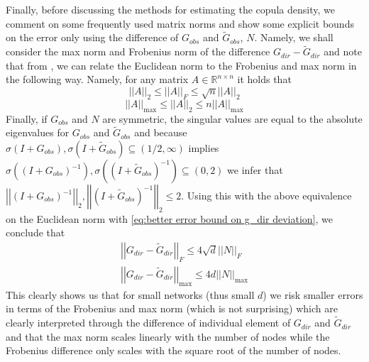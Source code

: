 \documentclass[../Thesis.tex]{subfiles}
\begin{document}
Finally, before discussing the methods for estimating the copula density, we comment on some frequently used matrix norms and show some explicit bounds on the error only using the difference of $G_{obs}$ and $\tilde{G}_{obs}$, $N$. Namely, we shall consider the max norm and Frobenius norm of the difference $G_{dir} - \tilde{G}_{dir}$ and note that from \cite{GoluVanl96}, we can relate the Euclidean norm to the Frobenius and max norm in the following way. Namely, for any matrix $A\in \mathbb{R}^{n\times n}$ it holds that
$$\left|\left| A \right|\right|_2 \leq \left|\left| A \right|\right|_F \leq \sqrt{n} \left|\left| A \right|\right|_2$$
$$\left|\left| A \right|\right|_{\max} \leq \left|\left| A \right|\right|_2 \leq n \left|\left| A \right|\right|_{\max} $$
Finally, if $G_{obs}$ and $N$ are symmetric, the singular values are equal to the absolute eigenvalues for $G_{obs}$ and $\tilde{G}_{obs}$ and because $\sigma\left(I + G_{obs}\right), \sigma\left(I + \tilde{G}_{obs}\right) \subseteq (1/2, \infty)$ implies $\sigma\left(\left(I + G_{obs}\right)^{-1}\right), \sigma\left(\left( I +\tilde{ G}_{obs}\right)^{-1}\right) \subseteq (0,2)$ we infer that $\left|\left| \left(I + G_{obs}\right)^{-1} \right|\right|_2 , \left|\left| \left(I + \tilde{G}_{obs}\right)^{-1} \right|\right|_2\leq 2$. Using this with the above equivalence on the Euclidean norm with \autoref{eq:better error bound on g_dir deviation}, we conclude that
\begin{equation}\label{eq:G_dir difference frob and max bounds}
    \begin{split}
        \left|\left| G_{dir} - \tilde{G}_{dir} \right|\right|_F \leq 4 \sqrt{d} \left|\left| N \right|\right|_F \\
        \left|\left| G_{dir} - \tilde{G}_{dir} \right|\right|_{\max} \leq 4 d \left|\left| N \right|\right|_{\max}
    \end{split}
\end{equation}
This clearly shows us that for small networks (thus small $d$) we risk smaller errors in terms of the Frobenius and max norm (which is not surprising) which are clearly interpreted through the difference of individual element of $G_{dir}$ and $\tilde{G}_{dir}$ and that the max norm scales linearly with the number of nodes while the Frobenius difference only scales with the square root of the number of nodes.
\end{document}
